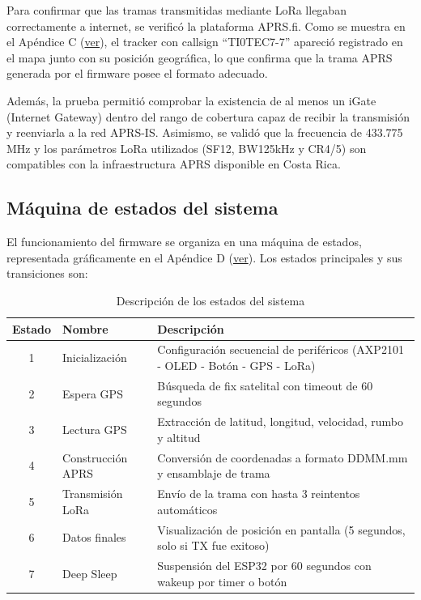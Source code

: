 \documentclass[conference]{IEEEtran}
\begin{document}
Para confirmar que las tramas transmitidas mediante LoRa llegaban correctamente a internet, se verificó la plataforma APRS.fi. Como se muestra en el Apéndice C (\hyperlink{apendice:aprs}{ver}), el tracker con callsign “TI0TEC7-7” apareció registrado en el mapa junto con su posición geográfica, lo que confirma que la trama APRS generada por el firmware posee el formato adecuado.

Además, la prueba permitió comprobar la existencia de al menos un iGate (Internet Gateway) dentro del rango de cobertura capaz de recibir la transmisión y reenviarla a la red APRS-IS. Asimismo, se validó que la frecuencia de 433.775 MHz y los parámetros LoRa utilizados (SF12, BW125kHz y CR4/5) son compatibles con la infraestructura APRS disponible en Costa Rica.

\subsection{Máquina de estados del sistema}

El funcionamiento del firmware se organiza en una máquina de estados, representada gráficamente en el Apéndice D (\hyperlink{apendice:maquina}{ver}). Los estados principales y sus transiciones son:

\begin{table}[H]
    \centering
    \scriptsize
    \caption{Descripción de los estados del sistema}
    \begin{tabular}{|c|l|p{4cm}|}
        \hline
        \textbf{Estado} & \textbf{Nombre} & \textbf{Descripción} \\
        \hline
        1 & Inicialización & Configuración secuencial de periféricos (AXP2101 - OLED - Botón - GPS - LoRa) \\
        \hline
        2 & Espera GPS & Búsqueda de fix satelital con timeout de 60 segundos \\
        \hline
        3 & Lectura GPS & Extracción de latitud, longitud, velocidad, rumbo y altitud \\
        \hline
        4 & Construcción APRS & Conversión de coordenadas a formato DDMM.mm y ensamblaje de trama \\
        \hline
        5 & Transmisión LoRa & Envío de la trama con hasta 3 reintentos automáticos \\
        \hline
        6 & Datos finales & Visualización de posición en pantalla (5 segundos, solo si TX fue exitoso) \\
        \hline
        7 & Deep Sleep & Suspensión del ESP32 por 60 segundos con wakeup por timer o botón \\
        \hline
    \end{tabular}
    \label{tab:estados}
\end{table}
\end{document}
